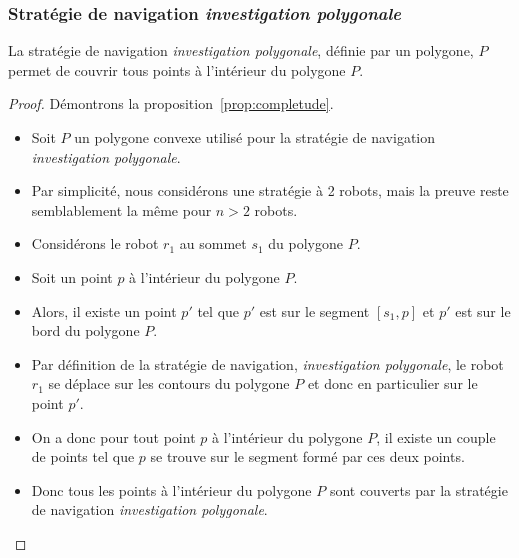 \documentclass[francais,RandD]{rapportPFE}
\begin{document}
			\subsubsection*{Stratégie de navigation \textit{investigation polygonale}}
				\begin{Proposition}
					La stratégie de navigation \textit{investigation polygonale}, définie par un polygone, $P$ permet de couvrir tous points à l'intérieur du polygone $P$.
					\label{prop:completude}
				\end{Proposition}
				\begin{proof}
					Démontrons la proposition~\ref{prop:completude}.
					\begin{itemize}
						\item Soit $P$ un polygone convexe utilisé pour la stratégie de navigation \textit{investigation polygonale}.
						\item Par simplicité, nous considérons une stratégie à 2 robots, mais la preuve reste semblablement la même pour $n > 2$ robots.
						\item Considérons le robot $r_1$ au sommet $s_1$ du polygone $P$.
						\item Soit un point $p$ à l'intérieur du polygone $P$.
						\item Alors, il existe un point $p'$ tel que $p'$ est sur le segment $[s_1, p]$ et $p'$ est sur le bord du polygone $P$.
						\item Par définition de la stratégie de navigation, \textit{investigation polygonale}, le robot $r_1$ se déplace sur les contours du polygone $P$ et donc en particulier sur le point $p'$.
						\item On a donc pour tout point $p$ à l'intérieur du polygone $P$, il existe un couple de points tel que $p$ se trouve sur le segment formé par ces deux points.
						\item Donc tous les points à l'intérieur du polygone $P$ sont couverts par la stratégie de navigation \textit{investigation polygonale}.
					\end{itemize}
				\end{proof}
\end{document}
